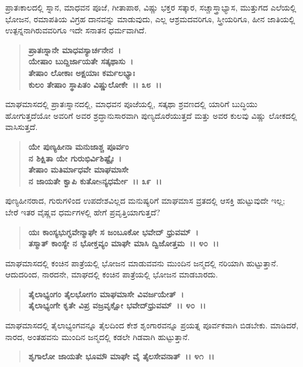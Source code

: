 ಪ್ರಾತಃಕಾಲದಲ್ಲಿ ಸ್ನಾನ, ಮಾಧವನ ಪೂಜೆ, ಗೀತಾಪಾಠ, ವಿಷ್ಣು ಭಕ್ತರ ಸತ್ಕಾರ, ಸಚ್ಚಾಸ್ತ್ರಾಭ್ಯಾಸ, ಮುತ್ತುಗದ ಎಲೆಯಲ್ಲಿ ಭೋಜನ, ರಮಾಪತಿಯ ವಿಗ್ರಹ ದಾನವನ್ನು ಮಾಡುವುದು, ಎಲ್ಲ ಆಶ್ರಮದವರಿಗೂ, ಸ್ತ್ರೀಯರಿಗೂ, ಹೀನ ಜಾತಿಯಲ್ಲಿ ಉತ್ಪನ್ನನಾಗಿರುವವರಿಗೂ ಇದೇ ಸನಾತನ ಧರ್ಮವಾಗಿದೆ.

\begin{verse}
\textbf{ಪ್ರಾತಃಸ್ನಾನೇ ಮಾಧವಸ್ಯಾರ್ಚನೇನ~।}\\\textbf{ಯೇಷಾಂ ಬುದ್ದಿರ್ಜಾಯತೇ ಸತ್ಕಥಾಸು~। }\\\textbf{ತೇಷಾಂ ಲೋಕಾಃ ಅಕ್ಷಯಾಃ ಕರ್ಮಲಭ್ಯಾಃ} \\\textbf{ಕುಲಂ ತೇಷಾಂ ಸ್ಥಾಪಿತಂ ವಿಷ್ಣುಲೋಕೇ~।। ೩೮~।।}
\end{verse}

ಮಾಘಮಾಸದಲ್ಲಿ ಪ್ರಾತಃಸ್ನಾನದಲ್ಲಿ, ಮಾಧವನ ಪೂಜೆಯಲ್ಲಿ, ಸತ್ಕಥಾ ಶ್ರವಣದಲ್ಲಿ ಯಾರಿಗೆ ಬುದ್ಧಿಯು ಹೋಗುತ್ತದೆಯೋ ಅವರಿಗೆ ಅವರ ಶ್ರದ್ಧಾನುಸಾರವಾಗಿ ಪುಣ್ಯ\break ದೊರೆಯುತ್ತದೆ ಮತ್ತು ಅವರ ಕುಲವು ವಿಷ್ಣು ಲೋಕದಲ್ಲಿ ವಾಸಿಸುತ್ತದೆ.

\begin{verse}
\textbf{ಯೇ ಪುಣ್ಯಹೀನಾ ಮನುಜಾಶ್ಚ ಪೂರ್ವಂ}\\\textbf{ನ ಶಿಕ್ಷಿತಾ ಯೇ ಗುರುಭಿರ್ವಿಶಿಷ್ಟೈಃ~। }\\\textbf{ತೇಷಾಂ ಮತಿರ್ಮಾಧವೇ ಮಾಘಮಾಸೇ} \\\textbf{ನ ಜಾಯತೇ ಕ್ವಾಪಿ ಕುತೋsನ್ಯಧರ್ಮೇ~।। ೩೯~।।}
\end{verse}

ಪುಣ್ಯಹೀನರಾದ, ಗುರುಗಳಿಂದ ಉಪದೇಶವಿಲ್ಲದ ಮನುಷ್ಯರಿಗೆ ಮಾಘಮಾಸ ವ್ರತದಲ್ಲಿ ಆಸಕ್ತಿ ಹುಟ್ಟುವುದೇ ಇಲ್ಲ; ಬೇರೆ ಇತರ ವೈಷ್ಣವ ಧರ್ಮಗಳಲ್ಲಿ ಹೇಗೆ ಪ್ರವೃತ್ತಿಯಾಗುತ್ತದೆ?

\begin{verse}
\textbf{ಯಃ ಕಾಂಸ್ಯಭುಗ್ಭವೇನ್ಮಾಘೇ ಸ ಜಂಬೂಕೋ ಭವೇದ್ ಧ್ರುವಮ್~।}\\\textbf{ತಸ್ಮಾತ್ ಕಾಂಸ್ಯೇ ನ ಭೋಕ್ತವ್ಯಂ ಮಾಘೇ ಮಾಸಿ ದ್ವಿಜೋತ್ತಮ~।। ೪೦~।।}
\end{verse}

ಮಾಘಮಾಸದಲ್ಲಿ ಕಂಚಿನ ಪಾತ್ರೆಯಲ್ಲಿ ಭೋಜನ ಮಾಡುವವನು ಮುಂದಿನ ಜನ್ಮದಲ್ಲಿ ನರಿಯಾಗಿ ಹುಟ್ಟುತ್ತಾನೆ. ಆದುದರಿಂದ, ನಾರದನೇ, ಮಾಘದಲ್ಲಿ ಕಂಚಿನ ಪಾತ್ರೆಯಲ್ಲಿ ಭೋಜನ ಮಾಡಬಾರದು.

\begin{verse}
\textbf{ತೈಲಾಭ್ಯಂಗಂ ತೈಲಭೋಗಂ ಮಾಘಮಾಸೇ ವಿವರ್ಜಯೇತ್~।}\\\textbf{ತೈಲಾಭ್ಯಂಗೇ ಕೃತೇ ವಿಪ್ರ ವಜ್ರವೃಕ್ಷೋ ಭವೇದ್‌ಧ್ರುವಮ್~।। ೪೦~।।}
\end{verse}

ಮಾಘಮಾಸದಲ್ಲಿ ತೈಲಾಭ್ಯಂಗವನ್ನೂ ತೈಲದಿಂದ ಕೇಶ ಶೃಂಗಾರವನ್ನೂ ಪ್ರಯತ್ನ ಪೂರ್ವಕವಾಗಿ ಬಿಡಬೇಕು. ಮಾಡಿದರೆ, ನಾರದ, ಅಂತಹವನು ಮುಂದಿನ ಜನ್ಮದಲ್ಲಿ ಕಡಲೇ ಗಿಡವಾಗಿ ಹುಟ್ಟುತ್ತಾನೆ.

\begin{verse}
\textbf{ಶೃಗಾಲೋ ಜಾಯತೇ ಭೂಮೌ ಮಾಘೇ ವೈ ತೈಲಸೇವನಾತ್~।। ೪೧~।।}
\end{verse}

